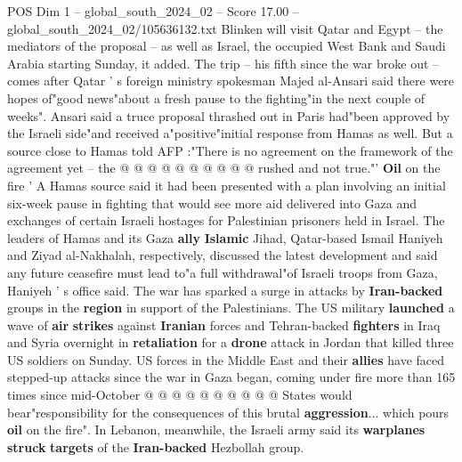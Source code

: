 \begin{textsample}{POS Dim 1 – global\_south\_2024\_02 – Score 17.00 – global\_south\_2024\_02/105636132.txt}
Blinken will visit Qatar and Egypt -- the mediators of the proposal -- as well as Israel, the occupied West Bank and Saudi Arabia starting Sunday, it added.
The trip -- his fifth since the war broke out -- comes after Qatar ' s foreign ministry spokesman Majed al-Ansari said there were hopes of"good news"about a fresh pause to the fighting"in the next couple of weeks".
Ansari said a truce proposal thrashed out in Paris had"been approved by the Israeli side"and received a"positive"initial response from Hamas as well.
But a source close to Hamas told AFP :"There is no agreement on the framework of the agreement yet -- the @ @ @ @ @ @ @ @ @ @ rushed and not true."' \textbf{Oil} on the fire ' A Hamas source said it had been presented with a plan involving an initial six-week pause in fighting that would see more aid delivered into Gaza and exchanges of certain Israeli hostages for Palestinian prisoners held in Israel.
The leaders of Hamas and its Gaza \textbf{ally} \textbf{Islamic} Jihad, Qatar-based Ismail Haniyeh and Ziyad al-Nakhalah, respectively, discussed the latest development and said any future ceasefire must lead to"a full withdrawal"of Israeli troops from Gaza, Haniyeh ' s office said.
The war has sparked a surge in attacks by \textbf{Iran-backed} groups in the \textbf{region} in support of the Palestinians.
The US military \textbf{launched} a wave of \textbf{air} \textbf{strikes} against \textbf{Iranian} forces and Tehran-backed \textbf{fighters} in Iraq and Syria overnight in \textbf{retaliation} for a \textbf{drone} attack in Jordan that killed three US soldiers on Sunday.
US forces in the Middle East and their \textbf{allies} have faced stepped-up attacks since the war in Gaza began, coming under fire more than 165 times since mid-October @ @ @ @ @ @ @ @ @ @ States would bear"responsibility for the consequences of this brutal \textbf{aggression}... which pours \textbf{oil} on the fire".
In Lebanon, meanwhile, the Israeli army said its \textbf{warplanes} \textbf{struck} \textbf{targets} of the \textbf{Iran-backed} Hezbollah group.

\end{textsample}
